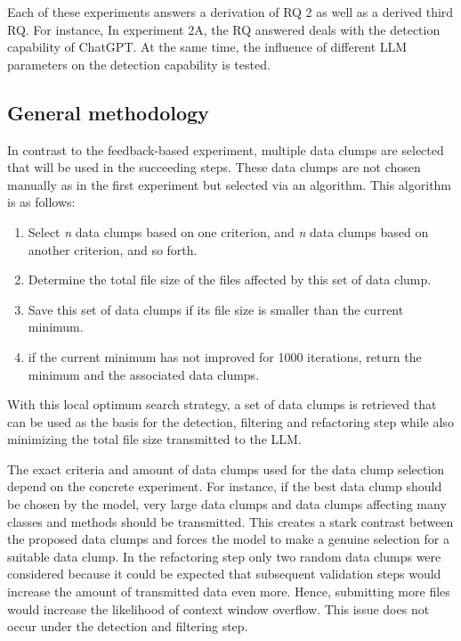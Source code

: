 Each of these experiments answers a derivation of RQ 2 as well as a derived third RQ. For instance, In experiment 2A, the RQ answered deals with the detection capability of ChatGPT. At the same time, the influence of different \ac{LLM} parameters on the detection capability is tested. 

\subsection{General methodology}

In contrast to the feedback-based experiment, multiple data clumps are selected that will be used in the succeeding steps. These data clumps are not chosen manually as in the first experiment but selected via an algorithm. This algorithm is as follows:
\begin{enumerate}
    \item Select 
\textit{n}
 data clumps based on one criterion, and 
\textit{n}
 data clumps based on another criterion, and so forth.
    \item Determine the total file size of the files affected by this set of data clump.
    \item Save this set of data clumps if its file size is smaller than the current minimum.
    \item if the current minimum has not improved for 1000 iterations, return the minimum and the associated data clumps.
\end{enumerate}

With this local optimum search strategy, a set of data clumps is retrieved that can be used as the basis for the detection, filtering and refactoring step while also minimizing the total file size transmitted to the \ac{LLM}. 

The exact criteria and amount of data clumps used for the data clump selection depend on the concrete experiment. For instance, if the best data clump should be chosen by the model, very large data clumps and data clumps affecting many classes and methods should be transmitted. This creates a stark contrast between the proposed data clumps and forces the model to make a genuine selection for a suitable data clump. In the refactoring step only two random data clumps were considered  because it could be expected that subsequent validation steps would increase the amount of transmitted data even more. Hence, submitting more files would increase the likelihood of context window overflow. This issue does not occur under the detection and filtering step. 


